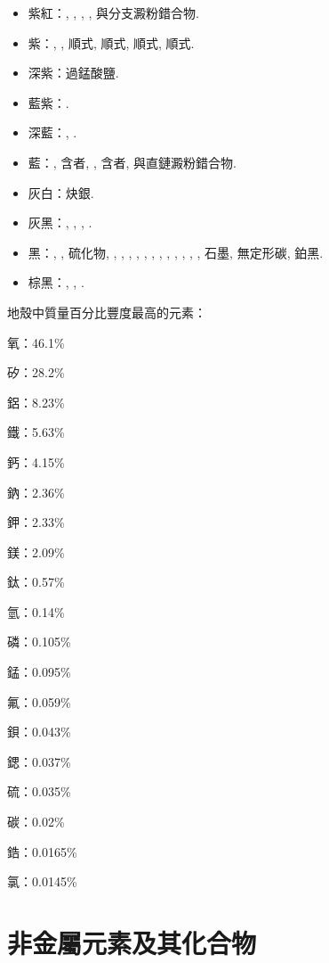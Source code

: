 \documentclass[a4paper,12pt]{report}
\begin{document}
\begin{itemize}
\item 紫紅：, \ce{[Cr(H2O)2Cl2]}, , , 與分支澱粉錯合物.
\item 紫：, , 順式\ce{[Cr(NH3)3Cl3]}, 順式, 順式\ce{[Co(NH3)3Cl3]}, 順式.
\item 深紫：過錳酸鹽.
\item 藍紫：.
\item 深藍：, .
\item 藍：, 含者, \ce{[Cr(H2O)4Cl2]}, 含者, 與直鏈澱粉錯合物.
\item 灰白：炔銀.
\item 灰黑：, , , .
\item 黑：, , 硫化物, , , , , , , , , , , , , 石墨, 無定形碳, 鉑黑.
\item 棕黑：, , .
\end{itemize}
地殼中質量百分比豐度最高的元素： 
\ben
\item 氧：46.1\%
\item 矽：28.2\%
\item 鋁：8.23\%
\item 鐵：5.63\%
\item 鈣：4.15\%
\item 鈉：2.36\%
\item 鉀：2.33\%
\item 鎂：2.09\%
\item 鈦：0.57\%
\item 氫：0.14\%
\item 磷：0.105\%
\item 錳：0.095\%
\item 氟：0.059\%
\item 鋇：0.043\%
\item 鍶：0.037\%
\item 硫：0.035\%
\item 碳：0.02\%
\item 鋯：0.0165\%
\item 氯：0.0145\%
\een


\section{非金屬元素及其化合物}
\end{document}
